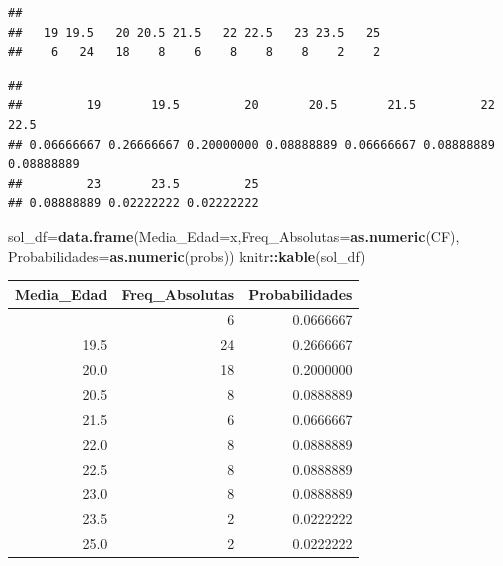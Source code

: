 \documentclass[
]{article}
\newenvironment{Shaded}{\begin{snugshade}}{\end{snugshade}}
\newcommand{\AttributeTok}[1]{\textcolor[rgb]{0.13,0.29,0.53}{#1}}
\newcommand{\FunctionTok}[1]{\textcolor[rgb]{0.13,0.29,0.53}{\textbf{#1}}}
\newcommand{\NormalTok}[1]{#1}
\newcommand{\OtherTok}[1]{\textcolor[rgb]{0.56,0.35,0.01}{#1}}
\newcommand{\SpecialCharTok}[1]{\textcolor[rgb]{0.81,0.36,0.00}{\textbf{#1}}}
\begin{document}
\begin{Shaded}
\end{Shaded}

\begin{verbatim}
## 
##   19 19.5   20 20.5 21.5   22 22.5   23 23.5   25 
##    6   24   18    8    6    8    8    8    2    2
\end{verbatim}

\begin{Shaded}
\end{Shaded}

\begin{verbatim}
## 
##         19       19.5         20       20.5       21.5         22       22.5 
## 0.06666667 0.26666667 0.20000000 0.08888889 0.06666667 0.08888889 0.08888889 
##         23       23.5         25 
## 0.08888889 0.02222222 0.02222222
\end{verbatim}

\begin{Shaded}
\begin{Highlighting}[]
\NormalTok{sol\_df}\OtherTok{=}\FunctionTok{data.frame}\NormalTok{(}\AttributeTok{Media\_Edad=}\NormalTok{x,}\AttributeTok{Freq\_Absolutas=}\FunctionTok{as.numeric}\NormalTok{(CF),}
                  \AttributeTok{Probabilidades=}\FunctionTok{as.numeric}\NormalTok{(probs))}
\NormalTok{knitr}\SpecialCharTok{::}\FunctionTok{kable}\NormalTok{(sol\_df)}
\end{Highlighting}
\end{Shaded}

\begin{longtable}[]{@{}rrr@{}}
\toprule\noalign{}
Media\_Edad & Freq\_Absolutas & Probabilidades \\
\midrule\noalign{}
\endhead
\bottomrule\noalign{}
\endlastfoot
19.0 & 6 & 0.0666667 \\
19.5 & 24 & 0.2666667 \\
20.0 & 18 & 0.2000000 \\
20.5 & 8 & 0.0888889 \\
21.5 & 6 & 0.0666667 \\
22.0 & 8 & 0.0888889 \\
22.5 & 8 & 0.0888889 \\
23.0 & 8 & 0.0888889 \\
23.5 & 2 & 0.0222222 \\
25.0 & 2 & 0.0222222 \\
\end{longtable}
\end{document}
